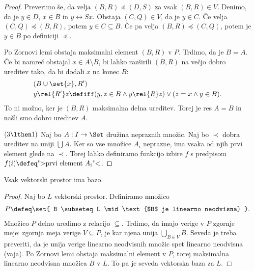 \begin{proof}
  Preverimo še, da velja $(B,R) \preceq (D,S)$ za vsak $(B,R) \in V$. Denimo, da je $y \in D$,
  $x \in B$ in $y \rel{S} x$. Obstaja $(C,Q) \in V$, da je $y \in C$. Če velja $(C,Q) \preceq (B,R)$,
  potem $y \in C \subseteq B$. Če pa velja $(B,R) \preceq (C,Q)$, potem je $y \in B$ po definiciji $\preceq$.

  Po Zornovi lemi obstaja maksimalni element $(B,R)$ v $P$. Trdimo, da je $B = A$. Če bi namreč
  obstajal $x \in A \setminus B$, bi lahko razširili $(B,R)$ na večjo dobro ureditev tako, da bi dodali $x$
  na konec $B$:
  \begin{align*}
    & (B \cup \set{x}, R') \\
    & y \rel{R'} z \defiff (y, z \in B \land y \rel{R} z) \lor (z = x \land y \in B).
  \end{align*}
  To ni možno, ker je $(B,R)$ maksimalna delna ureditev. Torej je res $A = B$ in
  našli smo dobro ureditev $A$.

  $(3 \lthen 1)$ Naj bo $A : I \to \Set$ družina nepraznih množic. Naj bo $\prec$ dobra ureditev
  na uniji $\bigcup A$. Ker so vse množice $A_i$ neprazne, ima vsaka od njih prvi element
  glede na $\prec$. Torej lahko definiramo funkcijo izbire $f$ s predpisom
  $f(i) \defeq \text{">prvi element $A_i$"<}$.
\end{proof}

\begin{izrek}
  Vsak vektorski prostor ima bazo.
\end{izrek}

\begin{proof}
  Naj bo $L$ vektorski prostor. Definiramo množico
  \begin{equation*}
    P \defeq \set{ B \subseteq L \mid \text{$B$ je linearno neodvisna} }.
  \end{equation*}
  Množico $P$ delno uredimo z relacijo $\subseteq$. Trdimo, da imajo verige v $P$ zgornje
  meje: zgornja meja verige $V \subseteq P$, je kar njena unija $\bigcup_{B \in V} B$. Seveda je
  treba preveriti, da je unija verige linearno neodvisnih množic spet linearno
  neodvisna (vaja). Po Zornovi lemi obstaja maksimalni element v $P$, torej
  maksimalna linearno neodvisna množica $B$ v $L$. To pa je seveda vektorska baza
  za $L$.
\end{proof}
